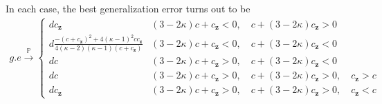 \documentclass[final]{l4dc2026}
\newcommand{\bSigma}{\bm{\Sigma}}
\newcommand{\bI}{\mathbf{I}}
\newcommand{\bz}{\mathbf{z}}
\newcommand{\bbP}{\mathbb{P}}
\newcommand{\rarrowp}{\xrightarrow[]{\bbP}}
\begin{document}
In each case, the best generalization error turns out to be
\begin{align*}
    g.e \rarrowp \begin{cases}
        d c_{\bz} & (3-2\kappa) c + c_{\bz} < 0 ,\quad  c + (3 - 2\kappa) c_{\bz} > 0 \\
        d \frac{-(c+ c_{\bz})^2 +  4(\kappa-1)^2 c c_{\bz}}{4 (\kappa-2) (\kappa-1) ( c + c_{\bz}) } & (3-2\kappa) c + c_{\bz} < 0 , \quad c + (3 - 2\kappa) c_{\bz} < 0 \\
        d c & (3-2\kappa) c + c_{\bz} > 0 ,\quad  c + (3 - 2\kappa) c_{\bz} < 0 \\
        d c & (3-2\kappa) c + c_{\bz} > 0 ,\quad  c + (3 - 2\kappa) c_{\bz} > 0, \quad c_{\bz} > c \\
        d c_{\bz} & (3-2\kappa) c + c_{\bz} > 0 ,\quad  c + (3 - 2\kappa) c_{\bz} > 0, \quad c_{\bz} < c
    \end{cases}
\end{align*}

\end{document}
